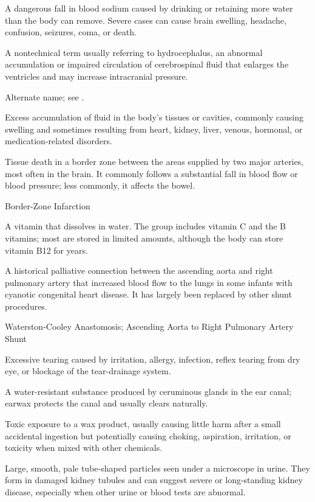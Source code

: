  A dangerous fall in blood sodium caused by drinking or retaining more water than the body can remove. Severe cases can cause brain swelling, headache, confusion, seizures, coma, or death.

 A nontechnical term usually referring to hydrocephalus, an abnormal accumulation or impaired circulation of cerebrospinal fluid that enlarges the ventricles and may increase intracranial pressure.

 Alternate name; see .

 Excess accumulation of fluid in the body's tissues or cavities, commonly causing swelling and sometimes resulting from heart, kidney, liver, venous, hormonal, or medication-related disorders.

 Tissue death in a border zone between the areas supplied by two major arteries, most often in the brain. It commonly follows a substantial fall in blood flow or blood pressure; less commonly, it affects the bowel.

\synonyms
Border-Zone Infarction

 A vitamin that dissolves in water. The group includes vitamin C and the B vitamins; most are stored in limited amounts, although the body can store vitamin B12 for years.

 A historical palliative connection between the ascending aorta and right pulmonary artery that increased blood flow to the lungs in some infants with cyanotic congenital heart disease. It has largely been replaced by other shunt procedures.

\synonyms
Waterston-Cooley Anastomosis; Ascending Aorta to Right Pulmonary Artery Shunt

 Excessive tearing caused by irritation, allergy, infection, reflex tearing from dry eye, or blockage of the tear-drainage system.

 A water-resistant substance produced by ceruminous glands in the ear canal; earwax protects the canal and usually clears naturally.

 Toxic exposure to a wax product, usually causing little harm after a small accidental ingestion but potentially causing choking, aspiration, irritation, or toxicity when mixed with other chemicals.

 Large, smooth, pale tube-shaped particles seen under a microscope in urine. They form in damaged kidney tubules and can suggest severe or long-standing kidney disease, especially when other urine or blood tests are abnormal.

